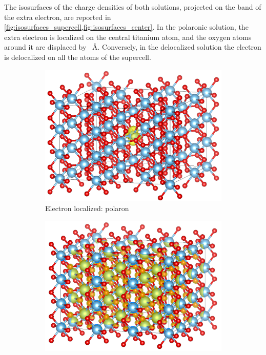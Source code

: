 The isosurfaces of the charge densities of both solutions, projected on the band of the extra electron, are reported in \cref{fig:isosurfaces_supercell,fig:isosurfaces_center}. In the polaronic solution, the extra electron is localized on the central titanium atom, and the oxygen atoms around it are displaced by \SI{}{\angstrom}. Conversely, in the delocalized solution the electron is delocalized on all the atoms of the supercell.

\begin{figure}
    \centering
    \begin{subfigure}[b]{0.49\textwidth}
        \centering
        \includegraphics[width=\textwidth]{figures/PARCHG_polaron_super}
        \caption{Electron localized: polaron}
        \label{fig:polaron_iso}
    \end{subfigure}
    \hfill
    \begin{subfigure}[b]{0.49\textwidth}
        \centering
        \includegraphics[width=\textwidth]{figures/PARCHG_delocalized_super}

\end{subfigure}
\end{figure}
